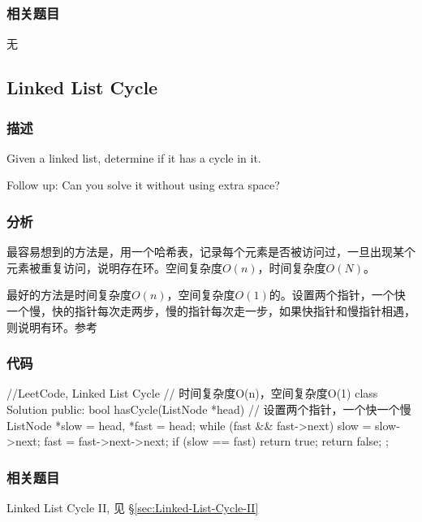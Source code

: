 \subsubsection{相关题目}
\begindot
\item 无
\myenddot


\subsection{Linked List Cycle}
\label{sec:Linked-List-Cycle}


\subsubsection{描述}
Given a linked list, determine if it has a cycle in it.

Follow up:
Can you solve it without using extra space?


\subsubsection{分析}
最容易想到的方法是，用一个哈希表，记录每个元素是否被访问过，一旦出现某个元素被重复访问，说明存在环。空间复杂度$O(n)$，时间复杂度$O(N)$。

最好的方法是时间复杂度$O(n)$，空间复杂度$O(1)$的。设置两个指针，一个快一个慢，快的指针每次走两步，慢的指针每次走一步，如果快指针和慢指针相遇，则说明有环。参考


\subsubsection{代码}
\begin{Code}
//LeetCode, Linked List Cycle
// 时间复杂度O(n)，空间复杂度O(1)
class Solution {
public:
    bool hasCycle(ListNode *head) {
        // 设置两个指针，一个快一个慢
        ListNode *slow = head, *fast = head;
        while (fast && fast->next) {
            slow = slow->next;
            fast = fast->next->next;
            if (slow == fast) return true;
        }
        return false;
    }
};
\end{Code}


\subsubsection{相关题目}
\begindot
\item Linked List Cycle II, 见 \S \ref{sec:Linked-List-Cycle-II}
\myenddot



